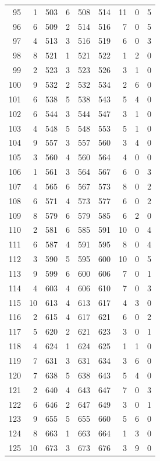 \begin{longtable}{@{}rrrrrrrrr@{}}
95 & 1 & 503 & 6 & 508 & 514 & 11 & 0 & 5 \\
96 & 6 & 509 & 2 & 514 & 516 & 7 & 0 & 5 \\
97 & 4 & 513 & 3 & 516 & 519 & 6 & 0 & 3 \\
98 & 8 & 521 & 1 & 521 & 522 & 1 & 2 & 0 \\
99 & 2 & 523 & 3 & 523 & 526 & 3 & 1 & 0 \\
100 & 9 & 532 & 2 & 532 & 534 & 2 & 6 & 0 \\
101 & 6 & 538 & 5 & 538 & 543 & 5 & 4 & 0 \\
102 & 6 & 544 & 3 & 544 & 547 & 3 & 1 & 0 \\
103 & 4 & 548 & 5 & 548 & 553 & 5 & 1 & 0 \\
104 & 9 & 557 & 3 & 557 & 560 & 3 & 4 & 0 \\
105 & 3 & 560 & 4 & 560 & 564 & 4 & 0 & 0 \\
106 & 1 & 561 & 3 & 564 & 567 & 6 & 0 & 3 \\
107 & 4 & 565 & 6 & 567 & 573 & 8 & 0 & 2 \\
108 & 6 & 571 & 4 & 573 & 577 & 6 & 0 & 2 \\
109 & 8 & 579 & 6 & 579 & 585 & 6 & 2 & 0 \\
110 & 2 & 581 & 6 & 585 & 591 & 10 & 0 & 4 \\
111 & 6 & 587 & 4 & 591 & 595 & 8 & 0 & 4 \\
112 & 3 & 590 & 5 & 595 & 600 & 10 & 0 & 5 \\
113 & 9 & 599 & 6 & 600 & 606 & 7 & 0 & 1 \\
114 & 4 & 603 & 4 & 606 & 610 & 7 & 0 & 3 \\
115 & 10 & 613 & 4 & 613 & 617 & 4 & 3 & 0 \\
116 & 2 & 615 & 4 & 617 & 621 & 6 & 0 & 2 \\
117 & 5 & 620 & 2 & 621 & 623 & 3 & 0 & 1 \\
118 & 4 & 624 & 1 & 624 & 625 & 1 & 1 & 0 \\
119 & 7 & 631 & 3 & 631 & 634 & 3 & 6 & 0 \\
120 & 7 & 638 & 5 & 638 & 643 & 5 & 4 & 0 \\
121 & 2 & 640 & 4 & 643 & 647 & 7 & 0 & 3 \\
122 & 6 & 646 & 2 & 647 & 649 & 3 & 0 & 1 \\
123 & 9 & 655 & 5 & 655 & 660 & 5 & 6 & 0 \\
124 & 8 & 663 & 1 & 663 & 664 & 1 & 3 & 0 \\
125 & 10 & 673 & 3 & 673 & 676 & 3 & 9 & 0 \\

\end{longtable}
